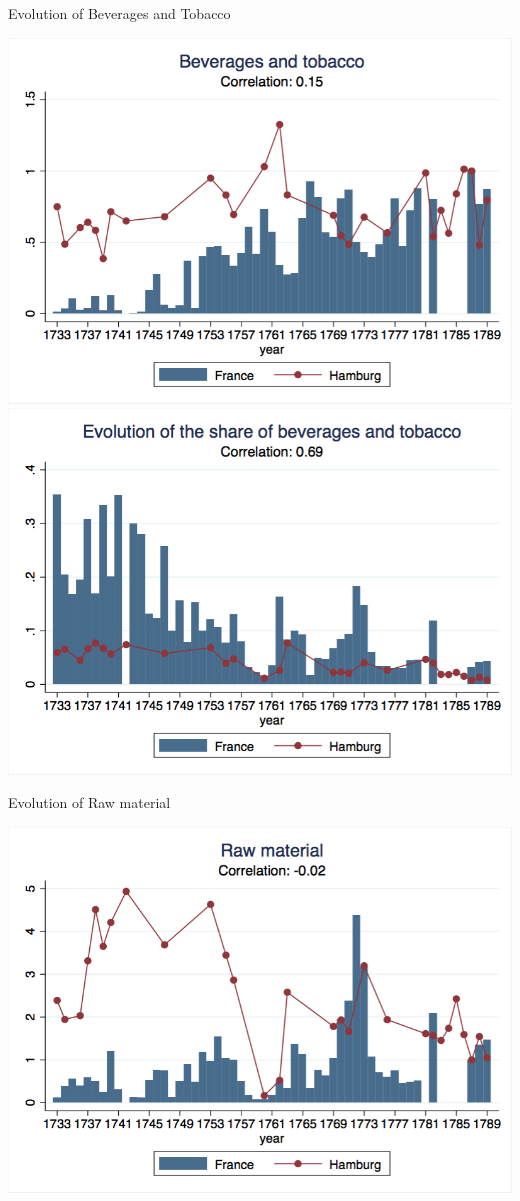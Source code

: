 \documentclass[12pt,a4paper,titlepage,english]{article}
\begin{document}
\caption{Evolution of Beverages and Tobacco}
\includegraphics[scale=.28]{bev_tobacco_long.png}
\includegraphics[scale=.28]{bev_tobacco_share.png}\\
\newpage
\caption{Evolution of Raw material}
\includegraphics[scale=.28]{raw_mat_long.png}
\end{document}
